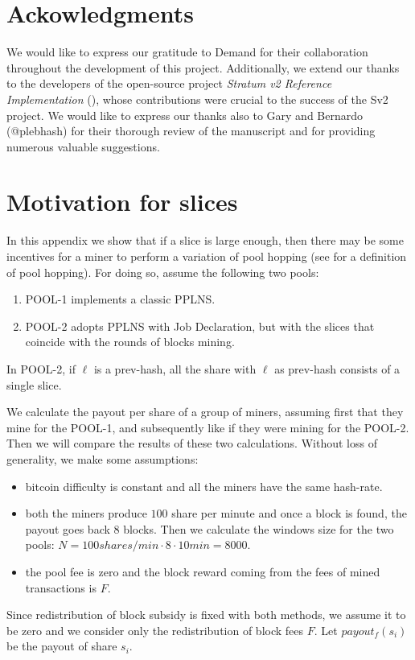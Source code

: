 \documentclass[10pt]{article}
\begin{document}
\section*{Ackowledgments}
We would like to express our gratitude to Demand \cite{demand} for their collaboration throughout the development of this project. Additionally, we extend our thanks to the developers of the open-source project \emph{Stratum v2 Reference Implementation} (\cite{sv2}), whose contributions were crucial to the success of the Sv2 project.
We would like to express our thanks also to Gary and Bernardo (@plebhash) for their thorough review of the manuscript and for providing numerous valuable suggestions.


\appendix
\section{Motivation for slices}
In this appendix we show that if a slice is large enough, then there may be some incentives for a miner to perform a variation of pool hopping (see \cite{rosenfeld} for a definition of pool hopping). For doing so, assume the following two pools:
\begin{enumerate}
	\item POOL-1 implements a classic PPLNS.
	\item POOL-2 adopts PPLNS with Job Declaration, but with the slices that coincide with the rounds of blocks mining.
\end{enumerate}
In POOL-2, if $\ell$ is a prev-hash, all the share with $\ell$ as prev-hash consists of a single slice.

We calculate the payout per share of a group of miners, assuming first that they mine for the POOL-1, and subsequently like if they were mining for the POOL-2. Then we will compare the results of these two calculations. Without loss of generality, we make some assumptions:
\begin{itemize}
	\item bitcoin difficulty is constant and all the miners have the same hash-rate.
	\item both the miners produce $100$ share per minute and once a block is found, the payout goes back $8$ blocks. Then we calculate the windows size for the two pools: $N = 100 shares/min \cdot 8 \cdot 10min = 8000$.
	\item the pool fee is zero and the block reward coming from the fees of mined transactions is $F$. 
	
\end{itemize}
Since redistribution of block subsidy is fixed with both methods, we assume it to be zero and we consider only the redistribution of block fees $F$.
Let $payout_f(s_i)$ be the payout of share $s_i$.
\end{document}
